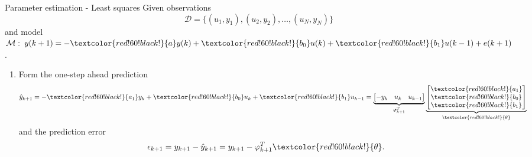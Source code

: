 \documentclass[presentation,aspectratio=169]{beamer}
\begin{document}
\begin{frame}[label={sec:org91fe707}]{Parameter estimation - Least squares}
Given observations \[\mathcal{D} = \{ (u_1,y_1), (u_2, y_2), \ldots, (u_N, y_N)\}\] and model \(\mathcal{M}: \; y(k+1) = -\textcolor{red!60!black!}{a}y(k) + \textcolor{red!60!black!}{b_0}u(k) + \textcolor{red!60!black!}{b_1}u(k-1)  + e(k+1)\).

\begin{enumerate}
\item Form the one-step ahead prediction
\[ \hat{y}_{k+1} = -\textcolor{red!60!black!}{a_1}y_k + \textcolor{red!60!black!}{b_0}u_k + \textcolor{red!60!black!}{b_1}u_{k-1} =  \underbrace{\begin{bmatrix} -y_k & u_k & u_{k-1} \end{bmatrix}}_{\varphi_{k+1}^T} \underbrace{\begin{bmatrix} \textcolor{red!60!black!}{a_1}\\\textcolor{red!60!black!}{b_0}\\\textcolor{red!60!black!}{b_1}\end{bmatrix}}_{\textcolor{red!60!black!}{\theta}}\] and the prediction error
   \[ \epsilon_{k+1} = y_{k+1} - \hat{y}_{k+1} = y_{k+1} - \varphi_{k+1}^T\textcolor{red!60!black!}{\theta}.\]
\end{enumerate}
\end{frame}
\end{document}
